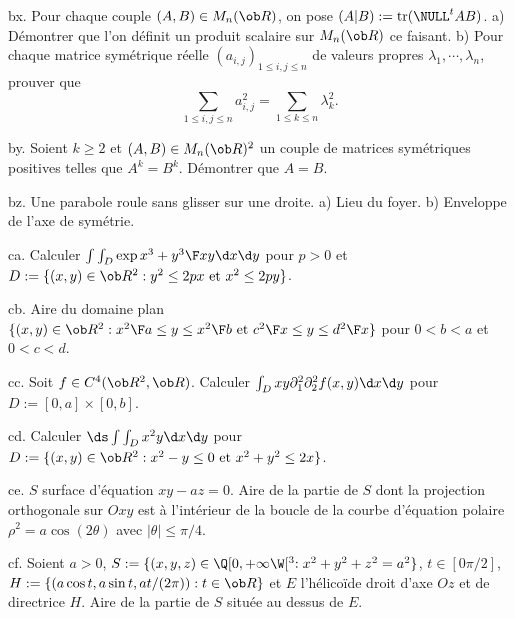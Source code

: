 \exo [Level=2,Fight=2,Learn=1,Field=\MatricesSymétriques,Type=\Others,Origin=\MP]  bx. 
Pour chaque couple $(A,B)\in\sc M_n(\ob R)$, on pose $(A|B):=\mbox{\rm tr}(\NULL^tAB)$. \pn
a) Démontrer que l'on définit un produit scalaire sur $\sc M_n(\ob R)$ ce faisant. 
b) Pour chaque matrice symétrique réelle $(a_{i,j})_{1\le i,j\le n}$ de valeurs propres $\lambda_1,\cdots,\lambda_n$, prouver que 
$$
\sum_{1\le i,j\le n}a_{i,j}^2=\sum_{1\le k\le n}\lambda_k^2.
$$

\exo [Level=2,Fight=1,Learn=0,Field=\MatricesSymétriques,Type=\Exercices,Origin=] by. 
Soient $k\ge2$ et $(A,B)\in\sc M_n(\ob R)^2$ un couple de matrices symétriques 
positives telles que $A^k=B^k$. \pn
Démontrer que $A=B$. 

\exo [Level=2,Fight=2,Learn=1,Field=\Coniques|\Roulement,Type=\TravauxDirigés,Origin=] bz. 
Une parabole roule sans glisser sur une droite. \pn
a) Lieu du foyer. 
b) Enveloppe de l'axe de symétrie. 

\exo [Level=2,Fight=2,Learn=1,Field=\IntégralesMultiples,Type=\Exercices,Origin=] ca. 
Calculer $\int\int_D\exp{x^3+y^3\F xy}\d x\d y$ pour $p>0$ et 
$D:=\{(x,y)\in\ob R^2:y^2\le 2px\hbox{ et }x^2\le 2py\}$. 

\exo [Level=2,Fight=2,Learn=1,Field=\Aires,Type=\Exercices,Origin=] cb. 
Aire du domaine 
plan $\{(x,y)\in\ob R^2:{x^2\F a}\le y\le {x^2\F b}\hbox{ et }{c^2\F x}\le y\le {d^2\F x}\}$ 
pour $0<b<a$ et $0<c<d$. 

\exo [Level=2,Fight=2,Learn=1,Field=\IntégralesMultiples,Type=\Exercices,Origin=] cc. 
Soit $f\in\sc C^4(\ob R^2,\ob R)$. 
Calculer $\int_D xy \partial_1^2\partial_2^2f(x,y)\d x\d y$ 
pour $D:=[0,a]\times[0,b]$. 

\exo [Level=2,Fight=2,Learn=1,Field=\IntégralesMultiples,Type=\Exercices,Origin=] cd. 
Calculer $\ds \int\int_D x^2y\d x\d y$ 
pour $D:=\{(x,y)\in\ob R^2:x^2-y\le0\hbox{ et }x^2+y^2\le 2x\}$. 

\exo [Level=2,Fight=2,Learn=1,Field=\Aires,Type=\Exercices,Origin=] ce. 
$S$ surface d'équation $xy-az=0$. 
Aire de la partie de $S$ dont la projection orthogonale 
sur $Oxy$ est à l'intérieur de la boucle de la courbe 
d'équation polaire $\rho^2=a\cos(2\theta)$ avec $|\theta|\le\pi/4$. 

\exo [Level=2,Fight=2,Learn=1,Field=\Aires|\Quadriques,Type=\Exercices,Origin=] cf. 
Soient $a>0$, $S:=\{(x,y,z)\in\Q[0,+\infty\W[^3:x^2+y^2+z^2=a^2\}$, $t\in[0\pi/2]$, 
$H:=\{(a\cos t,a\sin t,at/(2\pi)):t\in\ob R\}$ et $E$ l'hélicoïde 
droit d'axe $Oz$ et de directrice $H$. 
Aire de la partie de $S$ située au dessus de $E$. 

